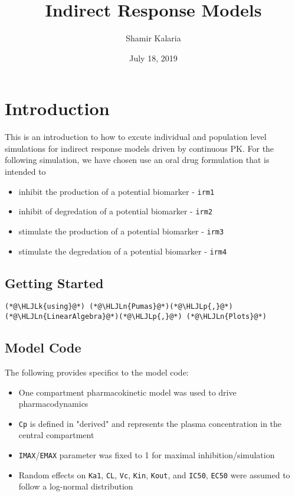 \documentclass[12pt,a4paper]{article}
\title{ Indirect Response Models }
\author{ Shamir Kalaria }
\date{ July 18, 2019 }
\newcommand{\HLJLk}[1]{\textcolor[RGB]{148,91,176}{\textbf{#1}}}
\newcommand{\HLJLn}[1]{#1}
\newcommand{\HLJLp}[1]{#1}
\begin{document}
\maketitle

\section{Introduction}
This is an introduction to how to excute individual and population level simulations for indirect response models driven by continuous PK. For the following simulation, we have chosen use an oral drug formulation that is intended to

\begin{itemize}
\item inhibit the production of a potential biomarker - \texttt{irm1}


\item inhibit of degredation of a potential biomarker - \texttt{irm2}


\item stimulate the production of a potential biomarker - \texttt{irm3}


\item stimulate the degredation of a potential biomarker - \texttt{irm4}

\end{itemize}
\subsection{Getting Started}

\begin{lstlisting}
(*@\HLJLk{using}@*) (*@\HLJLn{Pumas}@*)(*@\HLJLp{,}@*) (*@\HLJLn{LinearAlgebra}@*)(*@\HLJLp{,}@*) (*@\HLJLn{Plots}@*)
\end{lstlisting}


\subsection{Model Code}
The following provides specifics to the model code:

\begin{itemize}
\item One compartment pharmacokinetic model was used to drive pharmacodynamics


\item \texttt{Cp} is defined in "derived" and represents the plasma concentration in the central compartment


\item \texttt{IMAX}/\texttt{EMAX} parameter was fixed to 1 for maximal inhibition/simulation


\item Random effects on \texttt{Ka1}, \texttt{CL}, \texttt{Vc}, \texttt{Kin}, \texttt{Kout}, and \texttt{IC50}, \texttt{EC50} were assumed to follow a log-normal distribution

\end{itemize}
\end{document}
